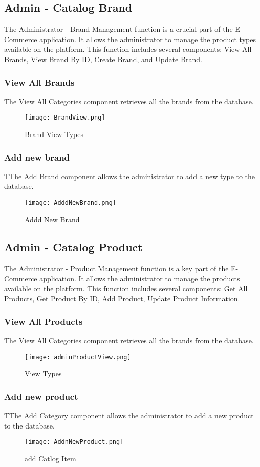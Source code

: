 \subsection{Admin - Catalog Brand}
The Administrator - Brand Management function is a crucial part of the E-Commerce application. It allows the administrator to manage the product types available on the platform. This function includes several components: View All Brands, View Brand By ID, Create Brand, and Update Brand.
\subsubsection[]{View All Brands}
The View All Categories component retrieves all the brands from the database.
\begin{figure}[H]
    \texttt{[image: BrandView.png]}
    \caption{Brand View Types}
    \label{fig:BrandView}
\end{figure}

\subsubsection[]{Add new brand}
TThe Add Brand component allows the administrator to add a new type to the database.
\begin{figure}[H]
    \texttt{[image: AdddNewBrand.png]}
    \caption{Addd New Brand}
    \label{fig:AdddNewBrand}
\end{figure}

\subsection{Admin - Catalog Product}
The Administrator - Product Management function is a key part of the E-Commerce application. It allows the administrator to manage the products available on the platform. This function includes several components: Get All Products, Get Product By ID, Add Product, Update Product Information.
\subsubsection[]{View All Products}
The View All Categories component retrieves all the brands from the database.
\begin{figure}[H]
    \texttt{[image: adminProductView.png]}
    \caption{View Types}
    \label{fig:adminProductView}
\end{figure}

\subsubsection[]{Add new product}
TThe Add Category component allows the administrator to add a new product to the database.
\begin{figure}[H]
    \texttt{[image: AddnNewProduct.png]}
    \caption{add Catlog Item}
    \label{fig:AddnNewProduct}
\end{figure}


